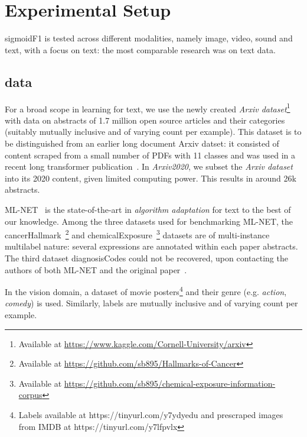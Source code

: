 
\section{Experimental Setup}
\label{sec:orgb44ba25}

sigmoidF1 is tested across different modalities, namely image, video, sound and text, with a focus on text: the most comparable research was on text data.


\subsection{data}


For a broad scope in learning for text, we use the newly created \emph{Arxiv dataset}\footnote{Available at \url{https://www.kaggle.com/Cornell-University/arxiv}} with data on abstracts of 1.7 million open source articles and their categories (suitably mutually inclusive and of varying count per example). This dataset is to be distinguished from an earlier long document Arxiv datset: it consisted of content scraped from a small number of PDFs with 11 classes \cite{oldArxiv} and was used in a recent long transformer publication~\cite{bigBird}. In \textit{Arxiv2020}, we subset the \emph{Arxiv dataset} into its 2020 content, given limited computing power. This results in around 26k abstracts.


ML-NET~\cite{multitaskLabel} is the state-of-the-art in \emph{algorithm adaptation} for text to the best of our knowledge. Among the three datasets used for benchmarking ML-NET, the cancerHallmark~\cite{cancerHallmarks}\footnote{Available at \url{https://github.com/sb895/Hallmarks-of-Cancer}} and chemicalExposure~\cite{chemExposure}\footnote{Available at \url{https://github.com/sb895/chemical-exposure-information-corpus}} datasets are of multi-instance multilabel nature: several expressions are annotated within each paper abstracts. The third dataset diagnosisCodes could not be recovered, upon contacting the authors of both ML-NET and the original paper~\cite{diagnosisCode}. 

In the vision domain, a dataset of movie posters\footnote{Labels available at https://tinyurl.com/y7ydyedu and prescraped images from IMDB at https://tinyurl.com/y7lfpvlx} and their genre (e.g. \emph{action}, \emph{comedy}) is used. Similarly, labels are mutually inclusive and of varying count per example. 


